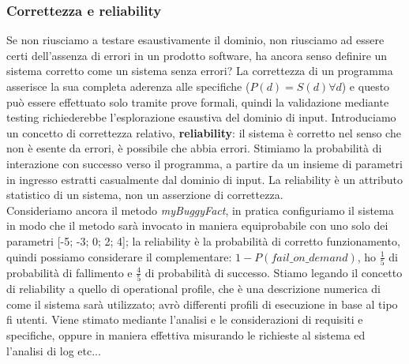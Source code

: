 \documentclass{article}
\begin{document}
\subsubsection{Correttezza e reliability}
Se non riusciamo a testare esaustivamente il dominio, non riusciamo ad essere certi dell'assenza di errori in un prodotto software, ha ancora senso definire un sistema corretto come un sistema senza errori? La correttezza di un programma asserisce la sua completa aderenza alle specifiche ($P(d) = S(d) \forall d$) e questo può essere effettuato solo tramite prove formali, quindi la validazione mediante testing richiederebbe l'esplorazione esaustiva del dominio di input. Introduciamo un concetto di correttezza relativo, \textbf{reliability}: il sistema è corretto nel senso che non è esente da errori, è possibile che abbia errori. Stimiamo la probabilità di interazione con successo verso il programma, a partire da un insieme di parametri in ingresso estratti casualmente dal dominio di input. La reliability è un attributo statistico di un sistema, non un asserzione di correttezza.\\ Consideriamo ancora il metodo \textit{myBuggyFact}, in pratica configuriamo il sistema in modo che il metodo sarà invocato in maniera equiprobabile con uno solo dei parametri [-5; -3; 0; 2; 4]; la reliability è la probabilità di corretto funzionamento, quindi possiamo considerare il complementare: $1 - P(fail\_on\_demand)$, ho $\frac{1}{5}$ di probabilità di fallimento e $\frac{4}{5}$ di probabilità di successo. Stiamo legando il concetto di reliability a quello di operational profile, che è una descrizione numerica di come il sistema sarà utilizzato; avrò differenti profili di esecuzione in base al tipo fi utenti. Viene stimato mediante l'analisi e le considerazioni di requisiti e specifiche, oppure in maniera effettiva misurando le richieste al sistema ed l'analisi di log etc...
\end{document}
